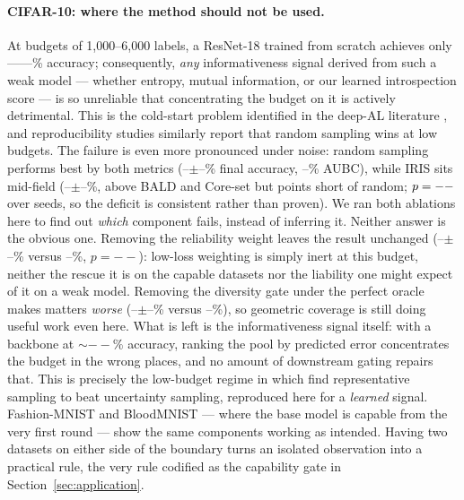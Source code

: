 \documentclass[a4paper,fleqn,longmktitle]{cas-sc}
\newcommand{\method}{IRIS}
\providecommand{\CifarCleanIrisFinal}{--}\providecommand{\CifarCleanIrisFinalStd}{--}
\providecommand{\CifarNoisyIrisFinal}{--}\providecommand{\CifarNoisyIrisFinalStd}{--}
\providecommand{\CifarNoisyRandomFinal}{--}\providecommand{\CifarNoisyRandomFinalStd}{--}
\providecommand{\CifarNoisyRandomAubc}{--}\providecommand{\CifarCleanBaldFinal}{--}
\providecommand{\CifarRoundZero}{--}\providecommand{\CifarAccLow}{--}
\providecommand{\CifarAccHigh}{--}\providecommand{\CifarNoisyNorelPairedP}{--}
\providecommand{\CifarCleanIrisNodivFinal}{--}\providecommand{\CifarCleanIrisNodivFinalStd}{--}
\providecommand{\CifarNoisyIrisNorelFinal}{--}\providecommand{\CifarNoisyIrisNorelFinalStd}{--}
\begin{document}
\paragraph{CIFAR-10: where the method should not be used.} At budgets
of 1,000--6,000 labels, a ResNet-18 trained from scratch achieves only
\CifarAccLow--\CifarAccHigh\% accuracy; consequently, \emph{any} informativeness signal
derived from such a weak model --- whether entropy, mutual information,
or our learned introspection score --- is so unreliable that
concentrating the budget on it is actively detrimental. This is the
cold-start problem identified in the deep-AL literature
\citep{ren2021}, and reproducibility studies similarly report that
random sampling wins at low budgets. The failure is even more
pronounced under noise: random sampling performs best by both metrics
(\CifarNoisyRandomFinal$\pm$\CifarNoisyRandomFinalStd\% final accuracy,
\CifarNoisyRandomAubc\% AUBC), while \method{} sits mid-field
(\CifarNoisyIrisFinal$\pm$\CifarNoisyIrisFinalStd\%, above BALD and
Core-set but \CifarNoisyIrisClassicFinalGain{} points short of random;
$p=--$ over \CifarNoisyNSeeds{} seeds, so the
deficit is consistent rather than proven). We ran both ablations here
to find out \emph{which} component fails, instead of inferring it.
Neither answer is the obvious one. Removing the reliability weight
leaves the result unchanged
(\CifarNoisyIrisNorelFinal$\pm$\CifarNoisyIrisNorelFinalStd\% versus
\CifarNoisyIrisFinal\%, $p=\CifarNoisyNorelPairedP$): low-loss weighting is simply inert
at this budget, neither the rescue it is on the capable datasets nor
the liability one might expect of it on a weak model. Removing the
diversity gate under the perfect oracle makes matters \emph{worse}
(\CifarCleanIrisNodivFinal$\pm$\CifarCleanIrisNodivFinalStd\% versus
\CifarCleanIrisFinal\%), so geometric coverage is still doing useful
work even here. What is left is the informativeness signal itself: with
a backbone at ${\sim}\CifarRoundZero\%$ accuracy, ranking the pool by predicted
error concentrates the budget in the wrong places, and no amount of
downstream gating repairs that. This is precisely the low-budget regime
in which \citet{hacohen2022} find representative sampling to beat
uncertainty sampling, reproduced here for a \emph{learned} signal.
Fashion-MNIST and BloodMNIST --- where the base model is capable from
the very first round --- show the same components working as
intended. Having two datasets on either side of the
boundary turns an isolated observation into a practical rule, the very
rule codified as the capability gate in
Section~\ref{sec:application}.
\end{document}
